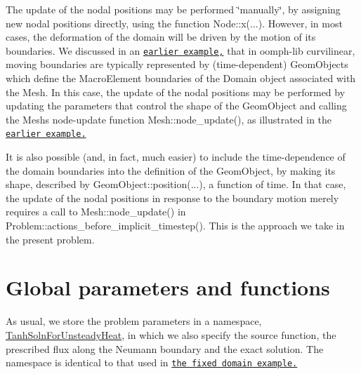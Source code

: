 The update of the nodal positions may be performed \char`\"{}manually\char`\"{}, by assigning new nodal positions directly, using the function {\ttfamily Node\+::x}(...). However, in most cases, the deformation of the domain will be driven by the motion of its boundaries. We discussed in an \href{../../../poisson/fish_poisson2/html/index.html}{\tt earlier example,} that in {\ttfamily oomph-\/lib} curvilinear, moving boundaries are typically represented by (time-\/dependent) {\ttfamily Geom\+Objects} which define the {\ttfamily Macro\+Element} boundaries of the {\ttfamily Domain} object associated with the {\ttfamily Mesh}. In this case, the update of the nodal positions may be performed by updating the parameters that control the shape of the {\ttfamily Geom\+Object} and calling the {\ttfamily Mesh\textquotesingle{}s} node-\/update function {\ttfamily Mesh\+::node\+\_\+update()}, as illustrated in the \href{../../../poisson/fish_poisson2/html/index.html}{\tt earlier example.}

It is also possible (and, in fact, much easier) to include the time-\/dependence of the domain boundaries into the definition of the {\ttfamily Geom\+Object}, by making its shape, described by {\ttfamily Geom\+Object\+::position}(...), a function of time. In that case, the update of the nodal positions in response to the boundary motion merely requires a call to {\ttfamily Mesh\+::node\+\_\+update()} in {\ttfamily Problem\+::actions\+\_\+before\+\_\+implicit\+\_\+timestep()}. This is the approach we take in the present problem.



 

\hypertarget{index_namespace}{}\section{Global parameters and functions}\label{index_namespace}
As usual, we store the problem parameters in a namespace, {\ttfamily \hyperlink{namespaceTanhSolnForUnsteadyHeat}{Tanh\+Soln\+For\+Unsteady\+Heat}}, in which we also specify the source function, the prescribed flux along the Neumann boundary and the exact solution. The namespace is identical to that used in \href{../../two_d_unsteady_heat/html/index.html}{\tt the fixed domain example.}



 

